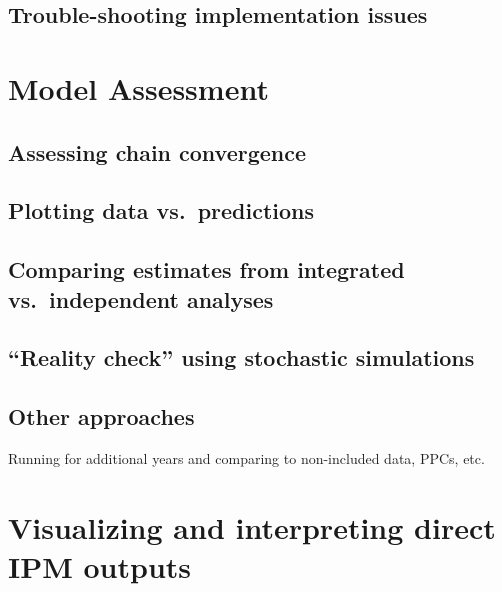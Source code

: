 \documentclass[
]{book}
\begin{document}
\hypertarget{trouble-shooting-implementation-issues}{%
\section{Trouble-shooting implementation issues}\label{trouble-shooting-implementation-issues}}

\hypertarget{ModelAssm}{%
\chapter{Model Assessment}\label{ModelAssm}}

\hypertarget{assessing-chain-convergence}{%
\section{Assessing chain convergence}\label{assessing-chain-convergence}}

\hypertarget{plotting-data-vs.-predictions}{%
\section{Plotting data vs.~predictions}\label{plotting-data-vs.-predictions}}

\hypertarget{comparing-estimates-from-integrated-vs.-independent-analyses}{%
\section{Comparing estimates from integrated vs.~independent analyses}\label{comparing-estimates-from-integrated-vs.-independent-analyses}}

\hypertarget{reality-check-using-stochastic-simulations}{%
\section{``Reality check'' using stochastic simulations}\label{reality-check-using-stochastic-simulations}}

\hypertarget{other-approaches}{%
\section{Other approaches}\label{other-approaches}}

Running for additional years and comparing to non-included data, PPCs, etc.

\hypertarget{ResultsViz}{%
\chapter{Visualizing and interpreting direct IPM outputs}\label{ResultsViz}}
\end{document}
